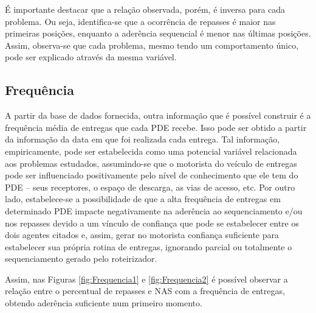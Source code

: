 É importante destacar que a relação observada, porém, é inversa para cada problema. 
Ou seja, identifica-se que a ocorrência de repasses é maior nas primeiras posições, enquanto a aderência sequencial é menor nas últimas posições.
Assim, observa-se que cada problema, mesmo tendo um comportamento único, pode ser explicado através da mesma variável.

\subsection{Frequência}

A partir da base de dados fornecida, outra informação que é possível construir é a frequência média de entregas que cada PDE recebe. 
Isso pode ser obtido a partir da informação da data em que foi realizada cada entrega. 
Tal informação, empiricamente, pode ser estabelecida como uma potencial variável relacionada aos problemas estudados, assumindo-se que o motorista do veículo de entregas pode ser influenciado positivamente pelo nível de conhecimento que ele tem do PDE – seus receptores, o espaço de descarga, as vias de acesso, etc. 
Por outro lado, estabelece-se a possibilidade de que a alta frequência de entregas em determinado PDE impacte negativamente na aderência ao sequenciamento e/ou nos repasses devido a um vínculo de confiança que pode se estabelecer entre os dois agentes citados e, assim, gerar no motorista confiança suficiente para estabelecer sua própria rotina de entregas, ignorando parcial ou totalmente o sequenciamento gerado pelo roteirizador.

Assim, nas Figuras \ref{fig:Frequencia1} e \ref{fig:Frequencia2} é possível observar a relação entre o percentual de repasses e NAS com a frequência de entregas, obtendo aderência suficiente num primeiro momento.

